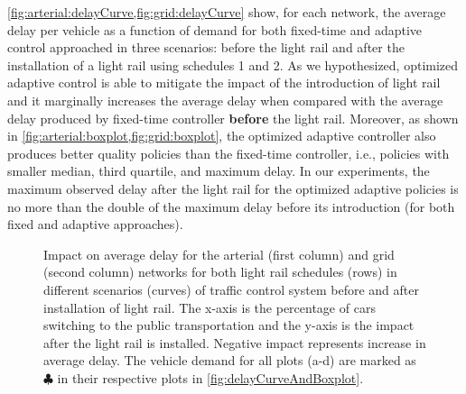 %
\cref{fig:arterial:delayCurve,fig:grid:delayCurve} show, for each network, the
average delay per vehicle as a function of demand for both fixed-time and adaptive
control approached in three scenarios: before the light rail and after the
installation of a light rail using schedules 1 and 2.
%
As we hypothesized, optimized adaptive control is able to mitigate the impact of
the introduction of light rail and it marginally increases the average delay
when compared with the average delay produced by fixed-time controller
\textbf{before} the light rail.
%
Moreover, as shown in \cref{fig:arterial:boxplot,fig:grid:boxplot}, the optimized
adaptive controller also produces better quality policies than the fixed-time
controller, i.e., policies with smaller median, third quartile, and maximum
delay.
%
In our experiments, the maximum observed delay after the light rail for the
optimized adaptive policies is no more than the double of the maximum delay before
its introduction (for both fixed and adaptive approaches).



\begin{figure*}[t!] \centering
%
\vspace{-5mm}
\caption{Impact on average delay for the arterial (first column) and grid
(second column) networks for both light rail schedules (rows) in different
scenarios (curves) of traffic control system before and after installation of
light rail.
The x-axis is the percentage of cars switching to the public transportation
and the y-axis is the impact after the light rail is installed.
%
Negative impact represents increase in average delay.
%
The vehicle demand for all plots (a-d) are marked as $\clubsuit$ in their
respective plots in \cref{fig:delayCurveAndBoxplot}.}
%
\label{fig:impact} \end{figure*}



